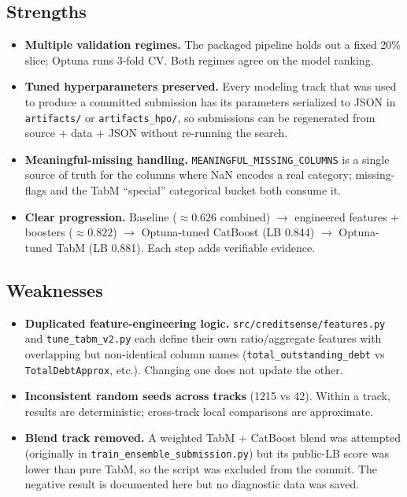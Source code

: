 \documentclass[11pt,a4paper]{article}
\begin{document}
\subsection{Strengths}

\begin{itemize}[leftmargin=*,nosep]
  \item \textbf{Multiple validation regimes.} The packaged pipeline holds out a fixed 20\% slice; Optuna runs 3-fold CV. Both regimes agree on the model ranking.
  \item \textbf{Tuned hyperparameters preserved.} Every modeling track that was used to produce a committed submission has its parameters serialized to JSON in \texttt{artifacts/} or \texttt{artifacts\_hpo/}, so submissions can be regenerated from source $+$ data $+$ JSON without re-running the search.
  \item \textbf{Meaningful-missing handling.} \texttt{MEANINGFUL\_MISSING\_COLUMNS} is a single source of truth for the columns where NaN encodes a real category; missing-flags and the TabM ``special'' categorical bucket both consume it.
  \item \textbf{Clear progression.} Baseline ($\approx 0.626$ combined) $\rightarrow$ engineered features + boosters ($\approx 0.822$) $\rightarrow$ Optuna-tuned CatBoost (LB 0.844) $\rightarrow$ Optuna-tuned TabM (LB 0.881). Each step adds verifiable evidence.
\end{itemize}

\subsection{Weaknesses}

\begin{itemize}[leftmargin=*,nosep]
  \item \textbf{Duplicated feature-engineering logic.} \texttt{src/creditsense/features.py} and \texttt{tune\_tabm\_v2.py} each define their own ratio/aggregate features with overlapping but non-identical column names (\texttt{total\_outstanding\_debt} vs \texttt{TotalDebtApprox}, etc.). Changing one does not update the other.
  \item \textbf{Inconsistent random seeds across tracks} (1215 vs 42). Within a track, results are deterministic; cross-track local comparisons are approximate.
  \item \textbf{Blend track removed.} A weighted TabM + CatBoost blend was attempted (originally in \texttt{train\_ensemble\_submission.py}) but its public-LB score was lower than pure TabM, so the script was excluded from the commit. The negative result is documented here but no diagnostic data was saved.
\end{itemize}
\end{document}
